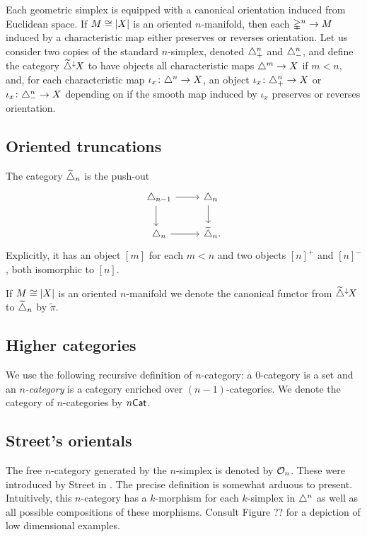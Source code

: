 Each geometric simplex is equipped with a canonical orientation induced from Euclidean space.
If $M \cong \lvert X\rvert$ is an oriented $n$-manifold, then each $\mathbb{\Delta}^n \to M$ induced by a characteristic map either preserves or reverses orientation.
Let us consider two copies of the standard $n$-simplex, denoted $\triangle^n_+$ and $\triangle^n_-$, and define the category $\widetilde{\triangle}^\downarrow\hspace{-1pt}X$ to have objects all characteristic maps $\triangle^m \to X$ if $m < n$, and, for each characteristic map $\iota_x \colon \triangle^n \to X$, an object $\iota_x \colon \triangle^n_+ \to X$ or $\iota_x \colon \triangle^n_- \to X$ depending on if the smooth map induced by $\iota_x$ preserves or reverses orientation.

\subsection{Oriented truncations}

The category $\widetilde{\triangle}_n$ is the push-out
\[
\begin{tikzcd}
	\simplex_{n-1} \rar \arrow[d,shift right=3pt] & \simplex_n \arrow[d,shift right=4pt] \phantom{.}\\  \simplex_n \rar & \widetilde\simplex_n.
\end{tikzcd}
\]
Explicitly, it has an object $[m]$ for each $m < n$ and two objects $[n]^+$ and $[n]^-$, both isomorphic to $[n]$.

If $M \cong \lvert X\rvert$ is an oriented $n$-manifold we denote the canonical functor from $\widetilde{\triangle}^\downarrow\hspace{-1pt}X$ to $\widetilde{\triangle}_n$ by $\widetilde\pi$.

\subsection{Higher categories}

We use the following recursive definition of $n$-category: a $0$-category is a set and an \textit{$n$-category} is a category enriched over $(n-1)$-categories.
We denote the category of $n$-categories by $n\mathsf{Cat}$.

\subsection{Street's orientals}

The free $n$-category generated by the $n$-simplex is denoted by $\mathcal{O}_n$.
These were introduced by Street in \cite{street1987orientals}.
The precise definition is somewhat arduous to present.
Intuitively, this $n$-category has a $k$-morphism for each $k$-simplex in $\triangle^n$ as well as all possible compositions of these morphisms.
Consult Figure ?? for a depiction of low dimensional examples.

